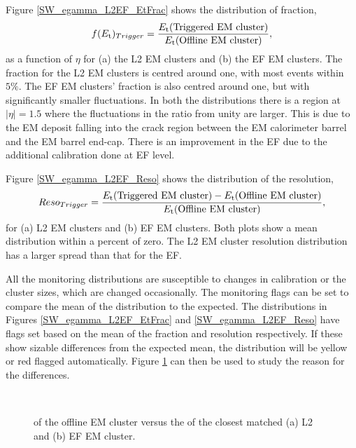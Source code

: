 Figure \ref{SW_egamma_L2EF_EtFrac} shows the distribution of \et{} fraction,
\begin{equation}
f(\mbox{$E_{\rm t}$}{})_{Trigger}=\frac{\mbox{$E_{\rm t}$}{}(\rm{Triggered~EM~cluster})}{\mbox{$E_{\rm t}$}{}(\rm{Offline~EM~cluster})},
\label{SW:EtFrac}
\end{equation}
as a function of $\eta{}$ for (a) the L2 EM clusters and (b) the EF EM clusters.
The \et{} fraction for the L2 EM clusters is centred around one, with most events within $5\%$.
The EF EM clusters' \et{} fraction is also centred around one, but with significantly smaller fluctuations.
In both the distributions there is a region at $|\eta{}|=1.5$ where the fluctuations in the ratio from unity are larger.
This is due to the EM deposit falling into the crack region between the EM calorimeter barrel and the EM barrel end-cap.
There is an improvement in the EF due to the additional calibration done at EF level. 

Figure \ref{SW_egamma_L2EF_Reso} shows the distribution of the \et{} resolution,
\begin{equation}
Reso_{Trigger}=\frac{\mbox{$E_{\rm t}$}{}(\rm{Triggered~EM~cluster})-\mbox{$E_{\rm t}$}{}(\rm{Offline~EM~cluster})}{\mbox{$E_{\rm t}$}{}(\rm{Offline~EM~cluster})},
\label{SW:EtReso}
\end{equation}
for (a) L2 EM clusters and (b) EF EM clusters.
Both plots show a mean \et{} distribution within a percent of zero. 
The L2 EM cluster \et{} resolution distribution has a larger spread than that for the EF.


All the monitoring distributions are susceptible to changes in calibration or the cluster sizes, which are changed occasionally. 
The monitoring flags can be set to compare the mean of the distribution to the expected.
The distributions in Figures \ref{SW_egamma_L2EF_EtFrac} and \ref{SW_egamma_L2EF_Reso} have flags set based on the mean of the \et{} fraction and \et{} resolution respectively. 
If these show sizable differences from the expected mean, the distribution will be yellow or red flagged automatically.
Figure \ref{SW_egamma_L2EF_EtEt} can then be used to study the reason for the differences.

 
\begin{figure}
\centering
\mbox{
   \quad
      \quad
}
\caption[Offline EM \et{} versus L2 and EF EM \et{}]{\et{} of the offline EM cluster versus the \et{} of the closest matched (a) L2 and (b) EF EM cluster.\label{SW_egamma_L2EF_EtEt}}
\end{figure}

